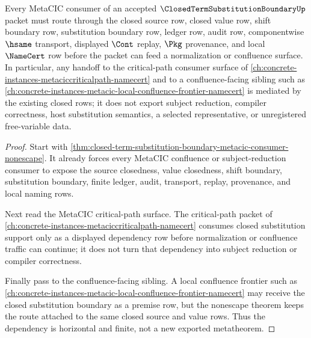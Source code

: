 \begin{theorem}
\label{thm:closed-term-substitution-boundary-metacic-dependency}
Every MetaCIC consumer of an accepted $\ClosedTermSubstitutionBoundaryUp$ packet must route through the closed source row, closed value row, shift boundary row, substitution boundary row, ledger row, audit row, componentwise $\hsame$ transport, displayed $\Cont$ replay, $\Pkg$ provenance, and local $\NameCert$ row before the packet can feed a normalization or confluence surface. In particular, any handoff to the critical-path consumer surface of \autoref{ch:concrete-instances-metaciccriticalpath-namecert} and to a confluence-facing sibling such as \autoref{ch:concrete-instances-metacic-local-confluence-frontier-namecert} is mediated by the existing closed rows; it does not export subject reduction, compiler correctness, host substitution semantics, a selected representative, or unregistered free-variable data.
\end{theorem}
\begin{proof}
Start with \autoref{thm:closed-term-substitution-boundary-metacic-consumer-nonescape}. It already forces every MetaCIC confluence or subject-reduction consumer to expose the source closedness, value closedness, shift boundary, substitution boundary, finite ledger, audit, transport, replay, provenance, and local naming rows.

Next read the MetaCIC critical-path surface. The critical-path packet of \autoref{ch:concrete-instances-metaciccriticalpath-namecert} consumes closed substitution support only as a displayed dependency row before normalization or confluence traffic can continue; it does not turn that dependency into subject reduction or compiler correctness.

Finally pass to the confluence-facing sibling. A local confluence frontier such as \autoref{ch:concrete-instances-metacic-local-confluence-frontier-namecert} may receive the closed substitution boundary as a premise row, but the nonescape theorem keeps the route attached to the same closed source and value rows. Thus the dependency is horizontal and finite, not a new exported metatheorem.
\end{proof}
